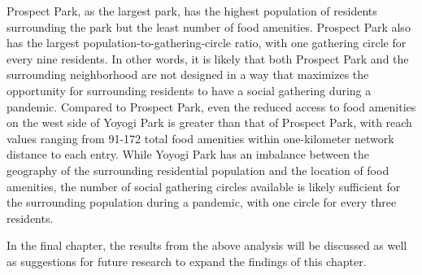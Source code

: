 \begin{multicols}{2}
Prospect Park, as the largest park, has the highest population of residents surrounding the park but the least number of food amenities. Prospect Park also has the largest population-to-gathering-circle ratio, with one gathering circle for every nine residents. In other words, it is likely that both Prospect Park and the surrounding neighborhood are not designed in a way that maximizes the opportunity for surrounding residents to have a social gathering during a pandemic. Compared to Prospect Park, even the reduced access to food amenities on the west side of Yoyogi Park is greater than that of Prospect Park, with reach values ranging from 91-172 total food amenities within one-kilometer network distance to each entry. While Yoyogi Park has an imbalance between the geography of the surrounding residential population and the location of food amenities, the number of social gathering circles available is likely sufficient for the surrounding population during a pandemic, with one circle for every three residents. 

In the final chapter, the results from the above analysis will be discussed as well as suggestions for future research to expand the findings of this chapter. 

\end{multicols}

